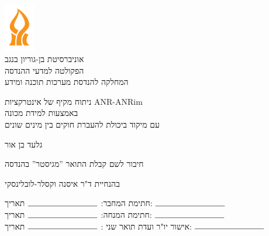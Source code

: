 \begin{titlepage}
    \begin{center}
        \vspace*{1cm}
        
        \includegraphics[width=0.1\textwidth]{bgu}\\
        אוניברסיטת בן-גוריון בנגב\\
        הפקולטה למדעי ההנדסה\\
        המחלקה להנדסת מערכות תוכנה ומידע
       
        \vspace{2cm}
        
        {\Large ניתוח מקיף של אינטרקציות ANR-ANRim\\ באמצעות למידת מכונה\\
        עם מיקוד ביכולת להעברת חוקים בין מינים שונים
      }
        
        \vspace{1.5cm}

        גלעד בן אור
        \vspace{1cm}
        
        חיבור לשם קבלת התואר ''מגיסטר'' בהנדסה
        
        \vspace{1cm}
        
        בהנחיית ד"ר איסנה וקסלר-לובלינסקי
        
        \vfill
        
        
        
        
        
       
        
        \begin{flushleft}
        חתימת המחבר:  \( \rule{3cm}{0.15mm} \) \hfill תאריך:  \( \rule{3cm}{0.15mm} \)   \\
        חתימת המנחה:  \( \rule{3cm}{0.15mm} \) \hfill תאריך:  \( \rule{3cm}{0.15mm} \)   \\
        אישור יו"ר ועדת תואר שני : \( \rule{3cm}{0.15mm} \) \hfill תאריך:  \( \rule{3cm}{0.15mm} \)   \\


\end{flushleft}
\end{center}
\end{titlepage}
